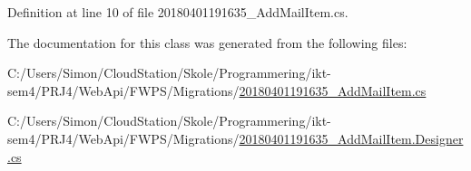 Definition at line 10 of file 20180401191635\+\_\+\+Add\+Mail\+Item.\+cs.



The documentation for this class was generated from the following files\+:\begin{DoxyCompactItemize}
\item 
C\+:/\+Users/\+Simon/\+Cloud\+Station/\+Skole/\+Programmering/ikt-\/sem4/\+P\+R\+J4/\+Web\+Api/\+F\+W\+P\+S/\+Migrations/\mbox{\hyperlink{20180401191635___add_mail_item_8cs}{20180401191635\+\_\+\+Add\+Mail\+Item.\+cs}}\item 
C\+:/\+Users/\+Simon/\+Cloud\+Station/\+Skole/\+Programmering/ikt-\/sem4/\+P\+R\+J4/\+Web\+Api/\+F\+W\+P\+S/\+Migrations/\mbox{\hyperlink{20180401191635___add_mail_item_8_designer_8cs}{20180401191635\+\_\+\+Add\+Mail\+Item.\+Designer.\+cs}}\end{DoxyCompactItemize}
